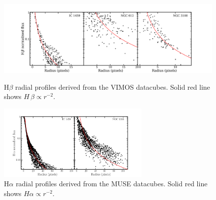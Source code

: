 		\begin{figure}
			\centering
			\includegraphics[width=\textwidth]{chapter5/vimos/Hbeta_profile.png}
			\caption[VIMOS H$\beta$ radial profiles]{H$\beta$ radial profiles derived from the VIMOS datacubes. Solid red line shows $H\,\beta \propto r^{-2}$.\label{fig:Hb_profile_VIMOS}} 
			

			\includegraphics[width=0.66\textwidth]{chapter5/muse/Halpha_profile.png}
			\caption[MUSE H$\alpha$ radial profiles]{H$\alpha$ radial profiles derived from the MUSE datacubes. Solid red line shows $H\alpha \propto r^{-2}$.\label{fig:Ha_profile_MUSE}} 
			
		\end{figure}
		
